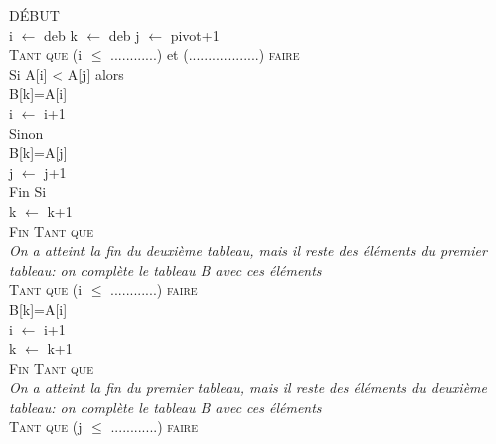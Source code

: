 \documentclass[a4paper,french]{article}
\begin{document}
{{{\hspace*{5mm} DÉBUT
\\
\hspace*{10mm} i $\longleftarrow$ deb 
\hspace*{5mm} k $\longleftarrow$ deb 
\hspace*{5mm} j $\longleftarrow$ pivot+1 
\\
\hspace*{10mm}  \textsc{Tant que} (i $\leq$ ............) et (..................) \textsc{faire}
\\
\hspace*{15mm}  Si A[i] < A[j] alors 
\\
\hspace*{20mm} B[k]=A[i]
\\
\hspace*{20mm} i $\longleftarrow$ i+1
\\
\hspace*{15mm}  Sinon 
\\
\hspace*{20mm} B[k]=A[j]
\\
\hspace*{20mm} j $\longleftarrow$ j+1
\\
\hspace*{15mm}  Fin Si
\\
\hspace*{15mm} k $\longleftarrow$ k+1
\\
\hspace*{10mm} \textsc{Fin Tant que}
\\
\textit{On a atteint la fin du deuxième tableau, mais il reste des éléments du premier tableau: on complète le tableau B avec ces éléments}
\\
\hspace*{10mm}  \textsc{Tant que} (i $\leq$ ............)  \textsc{faire}
\\
\hspace*{15mm}  B[k]=A[i]
\\
\hspace*{15mm} i $\longleftarrow$ i+1
\\
\hspace*{15mm} k $\longleftarrow$ k+1
\\
\hspace*{10mm} \textsc{Fin Tant que}
\\
\textit{On a atteint la fin du premier tableau, mais il reste des éléments du deuxième tableau: on complète le tableau B avec ces éléments}
\\
\hspace*{10mm}  \textsc{Tant que} (j $\leq$ ............)  \textsc{faire}
}}}
\end{document}
